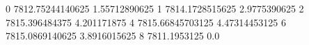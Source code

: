 0 7812.75244140625 1.55712890625
1 7814.1728515625 2.9775390625
2 7815.396484375 4.201171875
4 7815.66845703125 4.47314453125
6 7815.0869140625 3.8916015625
8 7811.1953125 0.0
